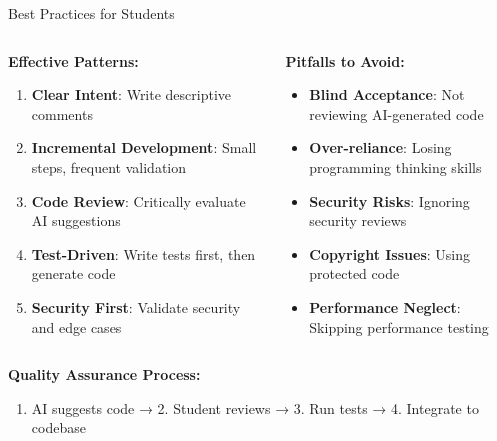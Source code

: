 \documentclass{beamer}
\begin{document}
\begin{frame}[t]{Best Practices for Students}
    \begin{columns}
        \begin{column}{0.5\textwidth}
            \textbf{Effective Patterns:}
            \begin{enumerate}
                \item \textbf{Clear Intent}: Write descriptive comments
                \item \textbf{Incremental Development}: Small steps, frequent validation
                \item \textbf{Code Review}: Critically evaluate AI suggestions
                \item \textbf{Test-Driven}: Write tests first, then generate code
                \item \textbf{Security First}: Validate security and edge cases
            \end{enumerate}
        \end{column}
        \begin{column}{0.5\textwidth}
            \textbf{Pitfalls to Avoid:}
            \begin{itemize}
                \item \textbf{Blind Acceptance}: Not reviewing AI-generated code
                \item \textbf{Over-reliance}: Losing programming thinking skills
                \item \textbf{Security Risks}: Ignoring security reviews
                \item \textbf{Copyright Issues}: Using protected code
                \item \textbf{Performance Neglect}: Skipping performance testing
            \end{itemize}
        \end{column}
    \end{columns}
    
    \vspace{0.5cm}
    \textbf{Quality Assurance Process:}
    \begin{enumerate}
        \item AI suggests code → 2. Student reviews → 3. Run tests → 4. Integrate to codebase
    \end{enumerate}
\end{frame}
\end{document}
